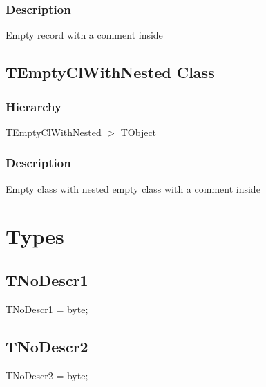 \documentclass{report}
\begin{document}
\subsubsection*{\large{\textbf{Description}}\normalsize\hspace{1ex}\hfill}
Empty record with a comment inside\subsection*{TEmptyClWithNested Class}
\subsubsection*{\large{\textbf{Hierarchy}}\normalsize\hspace{1ex}\hfill}
TEmptyClWithNested {$>$} TObject
\subsubsection*{\large{\textbf{Description}}\normalsize\hspace{1ex}\hfill}
Empty class with nested empty class with a comment inside\section{Types}
\subsection*{TNoDescr1}
\begin{list}{}{
\setlength{\itemindent}{0cm}
\setlength{\listparindent}{0cm}
\setlength{\leftmargin}{\evensidemargin}
\addtolength{\leftmargin}{\tmplength}
\settowidth{\labelsep}{X}
\addtolength{\leftmargin}{\labelsep}
\setlength{\labelwidth}{\tmplength}
}
\begin{flushleft}
\item[\textbf{Declaration}\hfill]
\begin{ttfamily}
TNoDescr1 = byte;\end{ttfamily}


\end{flushleft}
\end{list}
\subsection*{TNoDescr2}
\begin{list}{}{
\setlength{\itemindent}{0cm}
\setlength{\listparindent}{0cm}
\setlength{\leftmargin}{\evensidemargin}
\addtolength{\leftmargin}{\tmplength}
\settowidth{\labelsep}{X}
\addtolength{\leftmargin}{\labelsep}
\setlength{\labelwidth}{\tmplength}
}
\begin{flushleft}
\item[\textbf{Declaration}\hfill]
\begin{ttfamily}
TNoDescr2 = byte;\end{ttfamily}


\end{flushleft}
\end{list}
\end{document}
